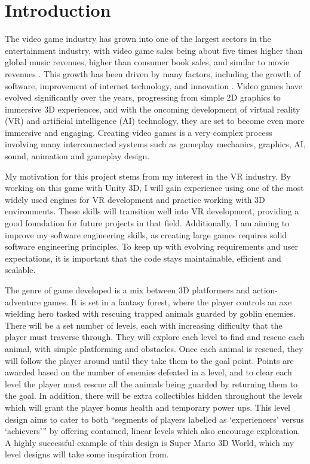\documentclass[10pt]{final_report}
\begin{document}
\chapter{Introduction}
The video game industry has grown into one of the largest sectors in the entertainment industry, with video game sales being about five times higher than global music revenues, higher than consumer book sales, and similar to movie revenues \cite{marchand2013value}. This growth has been driven by many factors, including the growth of software, improvement of internet technology, and innovation \cite{zackariasson2012video} . Video games have evolved significantly over the years, progressing from simple 2D graphics to immersive 3D experiences, and with the oncoming development of virtual reality (VR) and artificial intelligence (AI) technology, they are set to become even more immersive and engaging. Creating video games is a very complex process involving many interconnected systems such as gameplay mechanics, graphics, AI, sound, animation and gameplay design. \newline

My motivation for this project stems from my interest in the VR industry. By working on this game with Unity 3D, I will gain experience using one of the most widely used engines for VR development and practice working with 3D environments. These skills will transition well into VR development, providing a good foundation for future projects in that field. Additionally, I am aiming to improve my software engineering skills, as creating large games requires solid software engineering principles. To keep up with evolving requirements and user expectations, it is important that the code stays maintainable, efficient and scalable.\newline

The genre of game developed is a mix between 3D platformers and action-adventure games. It is set in a fantasy forest, where the player controls an axe wielding hero tasked with rescuing trapped animals guarded by goblin enemies. There will be a set number of levels, each with increasing difficulty that the player must traverse through. They will explore each level to find and rescue each animal, with simple platforming and obstacles. Once each animal is rescued, they will follow the player around until they take them to the goal point. Points are awarded based on the number of enemies defeated in a level, and to clear each level the player must rescue all the animals being guarded by returning them to the goal. In addition, there will be extra collectibles hidden throughout the levels which will grant the player bonus health and temporary power ups. This level design aims to cater to both ``segments of players labelled as `experiencers' versus `achievers''' \cite{zhao2022dynamic} by offering contained, linear levels which also encourage exploration. A highly successful example of this design is Super Mario 3D World, which my level designs will take some inspiration from.\newline
\end{document}
